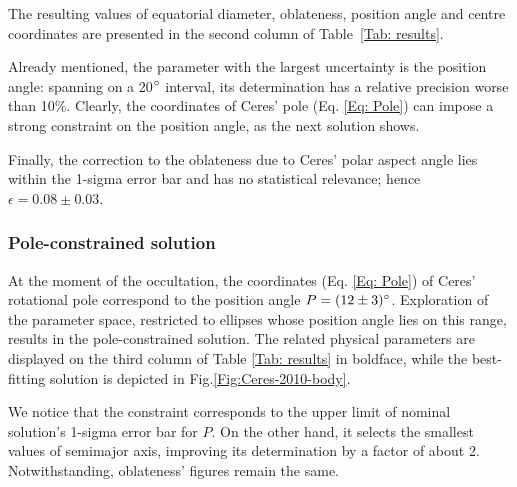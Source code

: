 \documentclass[useAMS,usenatbib]{mn2e}
\begin{document}
The resulting values of equatorial diameter, oblateness, position angle and centre coordinates are presented in the second column of Table~\ref{Tab: results}.%

Already mentioned, the parameter with the largest uncertainty is the position angle: spanning on a 20$\hbox{$^\circ$}$ interval, its determination has a relative precision worse than 10$\%$. Clearly, the coordinates of Ceres' pole (Eq. \ref{Eq: Pole}) can impose a strong constraint on the position angle, as the next solution shows.

Finally, the correction to the oblateness due to Ceres' polar aspect angle lies within the 1-sigma error bar and has no statistical relevance; hence $\epsilon = 0.08 \pm 0.03$.





\subsubsection{Pole-constrained solution}

At the moment of the occultation, the coordinates (Eq. \ref{Eq: Pole}) of Ceres' rotational pole correspond to the position angle $P = (12 \pm 3)\hbox{$^\circ$}$. Exploration of the parameter space, restricted to ellipses whose position angle lies on this range, results in the pole-constrained solution. The related physical parameters are displayed on the third column of Table \ref{Tab: results} in boldface, while the best-fitting solution is depicted in Fig.\ref{Fig:Ceres-2010-body}.

We notice that the constraint corresponds to the upper limit of nominal solution's 1-sigma error bar for $P$. On the other hand, it selects the smallest values of semimajor axis, improving its determination by a factor of about 2. Notwithstanding, oblateness' figures remain the same.
\end{document}
